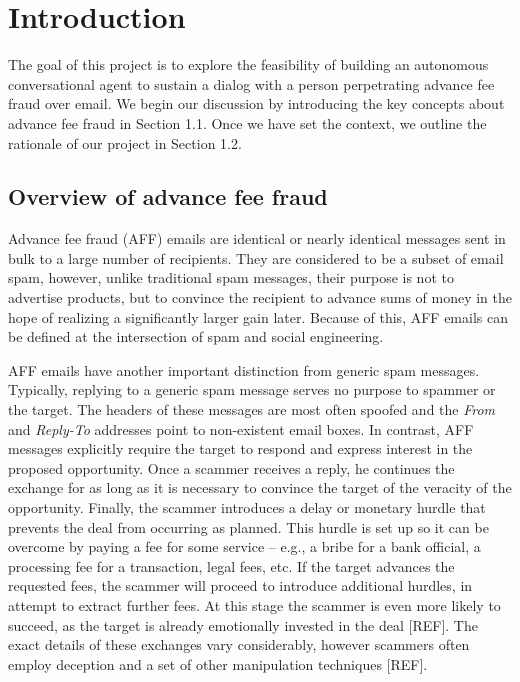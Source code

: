 \chapter{Introduction}
The goal of this project is to explore the feasibility of building an autonomous conversational agent to sustain a dialog with a person perpetrating advance fee fraud over email. We begin our discussion by introducing the key concepts about advance fee fraud in Section 1.1. Once we have set the context, we outline the rationale of our project in Section 1.2.

\section{Overview of advance fee fraud}
Advance fee fraud (AFF) emails are identical or nearly identical messages sent in bulk to a large number of recipients. They are considered to be a subset of email spam, however, unlike traditional spam messages, their purpose is not to advertise products, but to convince the recipient to advance sums of money in the hope of realizing a significantly larger gain later. Because of this, AFF emails can be defined at the intersection of spam and social engineering.

AFF emails have another important distinction from generic spam messages. Typically, replying to a generic spam message serves no purpose to spammer or the target. The headers of these messages are most often spoofed and the \emph{From} and \emph{Reply-To} addresses point to non-existent email boxes. In contrast, AFF messages explicitly require the target to respond and express interest in the proposed opportunity. Once a scammer receives a reply, he continues the exchange for as long as it is necessary to convince the target of the veracity of the opportunity. Finally, the scammer introduces a delay or monetary hurdle that prevents the deal from occurring as planned. This hurdle is set up so it can be overcome by paying a fee for some service -- e.g., a bribe for a bank official, a processing fee for a transaction, legal fees, etc. If the target advances the requested fees, the scammer will proceed to introduce additional hurdles, in attempt to extract further fees. At this stage the scammer is even more likely to succeed, as the target is already emotionally invested in the deal [REF]. The exact details of these exchanges vary considerably, however scammers often employ deception and a set of other manipulation techniques [REF].

